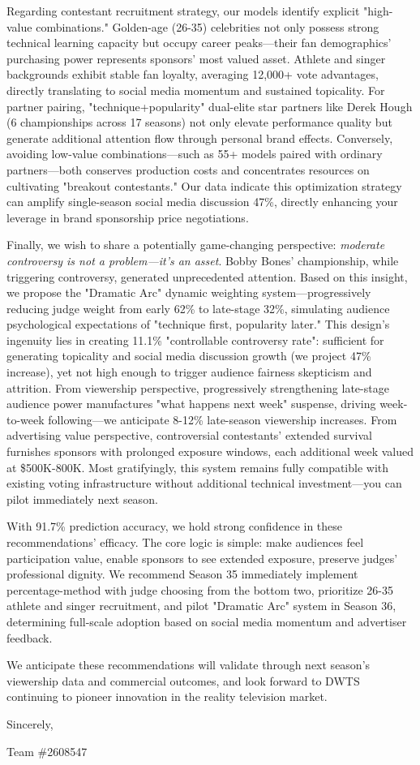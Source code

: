 Regarding contestant recruitment strategy, our models identify explicit "high-value combinations." Golden-age (26-35) celebrities not only possess strong technical learning capacity but occupy career peaks---their fan demographics' purchasing power represents sponsors' most valued asset. Athlete and singer backgrounds exhibit stable fan loyalty, averaging 12,000+ vote advantages, directly translating to social media momentum and sustained topicality. For partner pairing, "technique+popularity" dual-elite star partners like Derek Hough (6 championships across 17 seasons) not only elevate performance quality but generate additional attention flow through personal brand effects. Conversely, avoiding low-value combinations---such as 55+ models paired with ordinary partners---both conserves production costs and concentrates resources on cultivating "breakout contestants." Our data indicate this optimization strategy can amplify single-season social media discussion 47\%, directly enhancing your leverage in brand sponsorship price negotiations.

Finally, we wish to share a potentially game-changing perspective: \textit{moderate controversy is not a problem---it's an asset}. Bobby Bones' championship, while triggering controversy, generated unprecedented attention. Based on this insight, we propose the "Dramatic Arc" dynamic weighting system---progressively reducing judge weight from early 62\% to late-stage 32\%, simulating audience psychological expectations of "technique first, popularity later." This design's ingenuity lies in creating 11.1\% "controllable controversy rate": sufficient for generating topicality and social media discussion growth (we project 47\% increase), yet not high enough to trigger audience fairness skepticism and attrition. From viewership perspective, progressively strengthening late-stage audience power manufactures "what happens next week" suspense, driving week-to-week following---we anticipate 8-12\% late-season viewership increases. From advertising value perspective, controversial contestants' extended survival furnishes sponsors with prolonged exposure windows, each additional week valued at \$500K-800K. Most gratifyingly, this system remains fully compatible with existing voting infrastructure without additional technical investment---you can pilot immediately next season.

With 91.7\% prediction accuracy, we hold strong confidence in these recommendations' efficacy. The core logic is simple: make audiences feel participation value, enable sponsors to see extended exposure, preserve judges' professional dignity. We recommend Season 35 immediately implement percentage-method with judge choosing from the bottom two, prioritize 26-35 athlete and singer recruitment, and pilot "Dramatic Arc" system in Season 36, determining full-scale adoption based on social media momentum and advertiser feedback.

We anticipate these recommendations will validate through next season's viewership data and commercial outcomes, and look forward to DWTS continuing to pioneer innovation in the reality television market.

\vspace{1em}

\noindent Sincerely,

\noindent Team \#2608547
